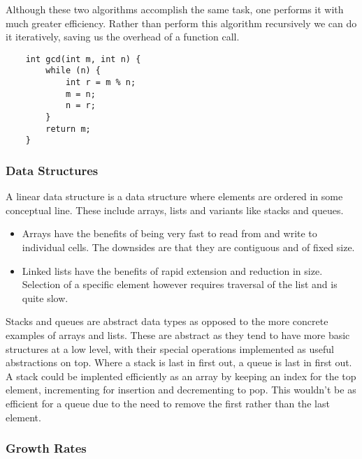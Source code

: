 \documentclass[12pt]{report}
\begin{document}
\begin{flushleft}
Although these two algorithms accomplish the same task, one performs it
with much greater efficiency. Rather than perform this algorithm recursively
we can do it iteratively, saving us the overhead of a function call.

\begin{lstlisting}
    int gcd(int m, int n) {
        while (n) {
            int r = m % n;
            m = n;
            n = r;
        }
        return m;
    }
\end{lstlisting}

\subsubsection*{Data Structures}

A linear data structure is a data structure where elements are ordered in some
conceptual line. These include arrays, lists and variants like stacks and
queues.
\begin{itemize}
    \item Arrays have the benefits of being very fast to read from and write to
        individual cells. The downsides are that they are contiguous and of
        fixed size.
    \item Linked lists have the benefits of rapid extension and reduction in
        size. Selection of a specific element however requires traversal of the
        list and is quite slow.
\end{itemize}
Stacks and queues are abstract data types as opposed to the more concrete
examples of arrays and lists. These are abstract as they tend to have more basic
structures at a low level, with their special operations implemented as useful
abstractions on top. Where a stack is last in first out, a queue is last in
first out. A stack could be implented efficiently as an array by keeping an
index for the top element, incrementing for insertion and decrementing to pop.
This wouldn't be as efficient for a queue due to the need to remove the first
rather than the last element.

\subsubsection*{Growth Rates}


\end{flushleft}
\end{document}
